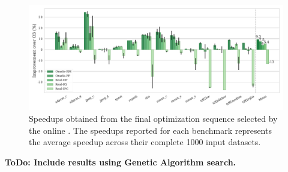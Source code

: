 \begin{figure}[htb]
    \centering
    \includegraphics[width=\textwidth]{figs/speedups.pdf}
    \caption{Speedups obtained from the final optimization sequence selected by the online {\itercomp}.
	         The speedups reported for each benchmark represents the average speedup across their complete 1000 input datasets.}
    \label{fig:speedups}
\end{figure}




\textbf{ToDo: Include results using Genetic Algorithm search.}
